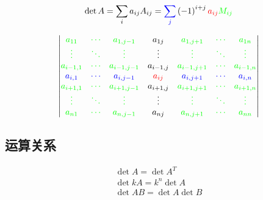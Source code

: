 \documentclass{article}
\begin{document}
\begin{definition}
    \[\det A=\sum_ia_{ij}A_{ij}={\textcolor{blue}{\sum_j}}\left(-1\right)^{i+j}\textcolor{red}{a_{ij}}\textcolor{green}{M_{ij}}\]

    \[\begin{vmatrix}
            \textcolor{green}{a_{11}}    & \textcolor{green}{\cdots} & \textcolor{green}{a_{1,j-1}}   & a_{1j}              & \textcolor{green}{a_{1,j+1}}   & \textcolor{green}{\cdots} & \textcolor{green}{a_{1n}}    \\
            \textcolor{green}{\vdots}    & \textcolor{green}{\ddots} & \textcolor{green}{\vdots}      & \vdots              & \textcolor{green}{\vdots}      & \textcolor{green}{\ddots} & \textcolor{green}{\vdots}    \\
            \textcolor{green}{a_{i-1,1}} & \textcolor{green}{\cdots} & \textcolor{green}{a_{i-1,j-1}} & a_{i-1,j}           & \textcolor{green}{a_{i-1,j+1}} & \textcolor{green}{\cdots} & \textcolor{green}{a_{i-1,n}} \\
            \textcolor{blue}{a_{i,1}}    & \textcolor{blue}{\cdots}  & \textcolor{blue}{a_{i,j-1}}    & \color{red}{a_{ij}} & \textcolor{blue}{a_{i,j+1}}    & \textcolor{blue}{\cdots}  & \textcolor{blue}{a_{i,n}}    \\
            \textcolor{green}{a_{i+1,1}} & \textcolor{green}{\cdots} & \textcolor{green}{a_{i+1,j-1}} & a_{i+1,j}           & \textcolor{green}{a_{i+1,j+1}} & \textcolor{green}{\cdots} & \textcolor{green}{a_{i+1,n}} \\
            \textcolor{green}{\vdots}    & \textcolor{green}{\ddots} & \textcolor{green}{\vdots}      & \vdots              & \textcolor{green}{\vdots}      & \textcolor{green}{\ddots} & \textcolor{green}{\vdots}    \\
            \textcolor{green}{a_{n1}}    & \textcolor{green}{\cdots} & \textcolor{green}{a_{n,j-1}}   & a_{nj}              & \textcolor{green}{a_{n,j+1}}   & \textcolor{green}{\cdots} & \textcolor{green}{a_{nn}}    \\
        \end{vmatrix}\]
\end{definition}

\subsection{运算关系}

\[\begin{gathered}
        \det A=\det A^T\\
        \det kA=k^n\det A\\
        \det AB=\det A\det B
    \end{gathered}\]
\end{document}
